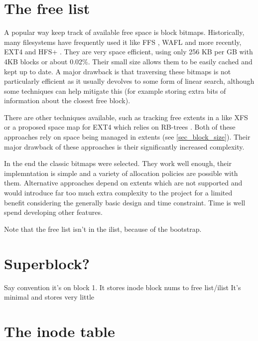     \section{The free list}
        \label{sec_free_list}

        A popular way keep track of available free space is block bitmaps.
        Historically, many filesystems have frequently used it like FFS
        \cite{FFS}, WAFL \cite{WALF} and more recently, EXT4
        \cite{ext4_space_maps} and HFS+
        \cite{https://developer.apple.com/library/archive/technotes/tn/tn1150.html}.
        They are very space efficient, using only 256 KB per GB with 4KB blocks
        or about 0.02\%. Their small size allows them to be easily cached and
        kept up to date. A major drawback is that traversing these bitmaps is
        not particularly efficient as it usually devolves to some form of
        linear search, although some techniques can help mitigate this (for
        example storing extra bits of information about the closest free
        block).

        There are other techniques available, such as tracking free extents in
        a \bplustree like XFS \cite{XFS} or a proposed space map for EXT4 which
        relies on RB-trees \cite{ext4_space_maps}. Both of these approaches
        rely on space being managed in extents (see \ref{sec_block_size}).
        Their major drawback of these approaches is their significantly
        increased complexity.

        In the end the classic bitmaps were selected. They work well enough,
        their implemntation is simple and a variety of allocation policies are
        possible with them. Alternative approaches depend on extents which are
        not supported and would introduce far too much extra complexity to the
        project for a limited benefit considering the generally basic design
        and time constraint. Time is well spend developing other features.

        Note that the free list isn't in the ilist, because of the bootstrap.

    \section{Superblock?}

        Say convention it's on block 1. It stores inode block nums to free list/ilist
        It's minimal and stores very little

    \section{The inode table}

